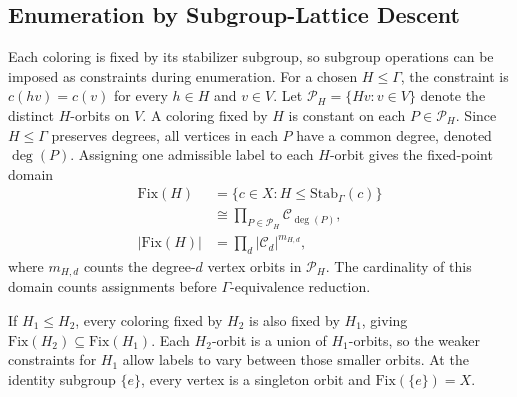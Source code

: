 \subsection{Enumeration by Subgroup-Lattice Descent}


\label{sec:enumeration}
Each coloring is fixed by its stabilizer subgroup, so subgroup operations can be imposed as constraints during enumeration. For a chosen $H\leq\Gamma$, the constraint is $c(hv)=c(v)$ for every $h\in H$ and $v\in V$. Let $\mathcal{P}_H=\{Hv:v\in V\}$ denote the distinct $H$-orbits on $V$. A coloring fixed by $H$ is constant on each $P\in\mathcal{P}_H$. Since $H\leq\Gamma$ preserves degrees, all vertices in each $P$ have a common degree, denoted $\deg(P)$. Assigning one admissible label to each $H$-orbit gives the fixed-point domain
\begin{equation}
\begin{aligned}
\mathrm{Fix}(H)&=\{c\in X:H\leq\mathrm{Stab}_{\Gamma}(c)\}\\
&\cong\prod_{P\in\mathcal{P}_H}\mathcal{C}_{\deg(P)},\\
|\mathrm{Fix}(H)|&=\prod_d|\mathcal{C}_d|^{m_{H,d}},
\end{aligned}
\label{eq:fixed_layer}
\end{equation}
where $m_{H,d}$ counts the degree-$d$ vertex orbits in $\mathcal{P}_H$. The cardinality of this domain counts assignments before $\Gamma$-equivalence reduction.

If $H_1\leq H_2$, every coloring fixed by $H_2$ is also fixed by $H_1$, giving $\mathrm{Fix}(H_2)\subseteq\mathrm{Fix}(H_1)$. Each $H_2$-orbit is a union of $H_1$-orbits, so the weaker constraints for $H_1$ allow labels to vary between those smaller orbits. At the identity subgroup $\{e\}$, every vertex is a singleton orbit and $\mathrm{Fix}(\{e\})=X$.

